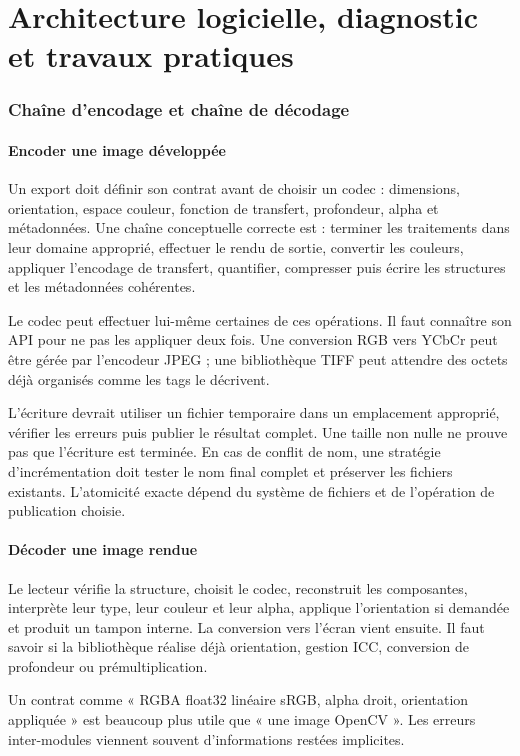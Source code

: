 \part{Architecture logicielle, diagnostic et travaux pratiques}
\section{Chaîne d'encodage et chaîne de décodage}
\subsection{Encoder une image développée}
Un export doit définir son contrat avant de choisir un
codec : dimensions, orientation, espace couleur, fonction
de transfert, profondeur, alpha et métadonnées. Une chaîne
conceptuelle correcte est : terminer les traitements dans
leur domaine approprié, effectuer le rendu de sortie,
convertir les couleurs, appliquer l'encodage de transfert,
quantifier, compresser puis écrire les structures et les
métadonnées cohérentes.

Le codec peut effectuer lui-même certaines de ces opérations.
Il faut connaître son API pour ne pas les appliquer deux
fois. Une conversion RGB vers YCbCr peut être gérée par
l'encodeur JPEG ; une bibliothèque TIFF peut attendre
des octets déjà organisés comme les tags le décrivent.

L'écriture devrait utiliser un fichier temporaire dans
un emplacement approprié, vérifier les erreurs puis
publier le résultat complet. Une taille non nulle ne
prouve pas que l'écriture est terminée. En cas de conflit
de nom, une stratégie d'incrémentation doit tester le
nom final complet et préserver les fichiers existants.
L'atomicité exacte dépend du système de fichiers et de
l'opération de publication choisie.

\subsection{Décoder une image rendue}
Le lecteur vérifie la structure, choisit le codec,
reconstruit les composantes, interprète leur type,
leur couleur et leur alpha, applique l'orientation
si demandée et produit un tampon interne. La conversion
vers l'écran vient ensuite. Il faut savoir si la
bibliothèque réalise déjà orientation, gestion ICC,
conversion de profondeur ou prémultiplication.

Un contrat comme « RGBA float32 linéaire sRGB, alpha droit,
orientation appliquée » est beaucoup plus utile que
« une image OpenCV ». Les erreurs inter-modules viennent
souvent d'informations restées implicites.

